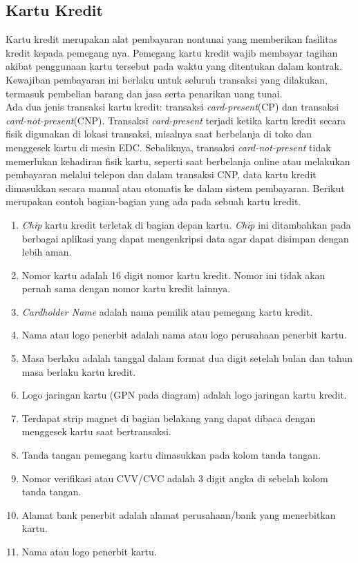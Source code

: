 \subsection{Kartu Kredit} \label{II.KartuKredit}
Kartu kredit merupakan alat pembayaran nontunai yang memberikan fasilitas kredit kepada pemegang nya\cite{wooster1966credit}. Pemegang kartu kredit wajib membayar tagihan  akibat penggunaan kartu tersebut pada waktu yang  ditentukan dalam kontrak\cite{wooster1966credit}. Kewajiban pembayaran ini berlaku untuk seluruh transaksi yang dilakukan, termasuk pembelian barang dan jasa serta penarikan uang tunai\cite{flitcroft2009credit}. \\
Ada dua jenis transaksi  kartu kredit: transaksi \textit{card-present}(CP) dan transaksi \textit{card-not-present}(CNP)\cite{kumar2016method}. Transaksi \textit{card-present} terjadi ketika kartu kredit secara fisik digunakan di lokasi transaksi, misalnya saat berbelanja di toko dan menggesek kartu di mesin EDC. Sebaliknya, transaksi \textit{card-not-present} tidak memerlukan kehadiran fisik kartu, seperti saat berbelanja online atau melakukan pembayaran melalui telepon dan dalam transaksi CNP, data kartu kredit dimasukkan secara manual atau otomatis ke dalam sistem pembayaran\cite{kumar2016method}. Berikut merupakan contoh bagian-bagian yang ada pada sebuah kartu kredit.
\begin{enumerate}[noitemsep]
    \item \textit{Chip}  kartu kredit terletak di bagian depan kartu. \textit{Chip} ini ditambahkan pada berbagai aplikasi yang dapat mengenkripsi data agar dapat disimpan dengan lebih aman.
    \item  Nomor kartu adalah 16 digit nomor kartu kredit. Nomor ini tidak akan pernah sama dengan nomor kartu kredit lainnya.
    \item \textit{Cardholder Name} adalah nama  pemilik atau pemegang kartu kredit.
    \item Nama atau logo penerbit adalah nama atau logo perusahaan penerbit kartu.
    \item Masa berlaku adalah tanggal dalam format dua digit setelah bulan dan tahun  masa berlaku kartu kredit.
    \item Logo jaringan kartu (GPN pada diagram) adalah logo jaringan kartu kredit.
    \item Terdapat strip magnet di bagian belakang yang dapat dibaca dengan menggesek kartu saat bertransaksi.
    \item Tanda tangan pemegang kartu dimasukkan pada kolom tanda tangan.
    \item  Nomor verifikasi atau CVV/CVC adalah 3 digit angka di sebelah kolom tanda tangan.
    \item Alamat bank penerbit adalah alamat perusahaan/bank yang menerbitkan kartu.
    \item  Nama atau logo penerbit kartu.
\end{enumerate}
